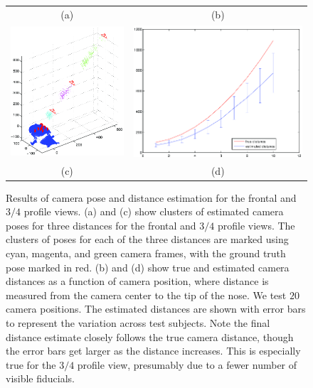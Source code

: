 \documentclass[runningheads]{llncs}
\begin{document}
\begin{figure}[ht!]
\begin{tabular}{cc}
(a) & (b) \\
\includegraphics[width=.5\linewidth]{resources/figures/cameraloc_3q.png} &
\includegraphics[width=.5\linewidth]{resources/figures/errorbar_3q.png} \\
(c) & (d)
\end{tabular}
\caption{	
Results of camera pose and distance estimation for the frontal and $3/4$ profile views.
(a) and (c) show clusters of estimated camera poses for three distances for the frontal and $3/4$ profile views.
The clusters of poses for each of the three distances are marked using cyan, magenta, and green camera frames, with the ground truth pose marked in red.
(b) and (d) show true and estimated camera distances as a function of camera position, where distance is measured from the camera center to the tip of the nose.
We test $20$ camera positions.
The estimated distances are shown with error bars to represent the variation across test subjects.
Note the final distance estimate closely follows the true camera distance, though the error bars get larger as the distance increases.  
This is especially true for the $3/4$ profile view, presumably due to a fewer number of visible fiducials.   
}
\label{fig:results}
\end{figure}
\end{document}
